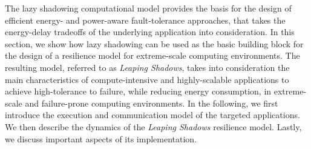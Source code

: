




%



The lazy shadowing computational model provides the basis for the design of efficient energy- and power-aware fault-tolerance approaches, that takes the energy-delay tradeoffs of the underlying application into consideration. In this section, we show how lazy shadowing can be used as the basic building block for the design of a resilience model for extreme-scale computing environments. The resulting model, referred to as {\it Leaping Shadows}, takes into consideration the main characteristics of compute-intensive and highly-scalable applications to achieve high-tolerance to failure, while reducing energy consumption, in extreme-scale and failure-prone computing environments. In the following, we first introduce the execution and communication model of the targeted applications. We then describe the dynamics of the {\it Leaping Shadows} resilience model. Lastly, we discuss important aspects of its implementation. 

